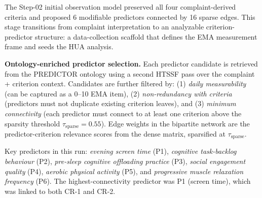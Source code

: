 \documentclass[11pt,a4paper]{article}
\newcommand{\PredictorCount}{6}
\newcommand{\SparseEdgeCount}{16}
\begin{document}
The Step-02 initial observation model preserved all four complaint-derived criteria and proposed \PredictorCount{} modifiable predictors connected by \SparseEdgeCount{} sparse edges. This stage transitions from complaint interpretation to an analyzable criterion-predictor structure: a data-collection scaffold that defines the EMA measurement frame and seeds the HUA analysis.

\begin{tcolorbox}[colback=PhoenixSoft,colframe=PhoenixGreen!40,boxrule=0.5pt,arc=1.5mm,left=7pt,right=7pt,top=6pt,bottom=6pt]
\small\textbf{Ontology-enriched predictor selection.} Each predictor candidate is retrieved from the PREDICTOR ontology using a second HTSSF pass over the complaint + criterion context. Candidates are further filtered by: (1) \emph{daily measurability} (can be captured as a 0--10 EMA item), (2) \emph{non-redundancy with criteria} (predictors must not duplicate existing criterion leaves), and (3) \emph{minimum connectivity} (each predictor must connect to at least one criterion above the sparsity threshold $\tau_{\text{sparse}} = 0.55$). Edge weights in the bipartite network are the predictor-criterion relevance scores from the dense matrix, sparsified at $\tau_{\text{sparse}}$.
\end{tcolorbox}

Key predictors in this run: \textit{evening screen time} (P1), \textit{cognitive task-backlog behaviour} (P2), \textit{pre-sleep cognitive offloading practice} (P3), \textit{social engagement quality} (P4), \textit{aerobic physical activity} (P5), and \textit{progressive muscle relaxation frequency} (P6). The highest-connectivity predictor was P1 (screen time), which was linked to both CR-1 and CR-2.
\end{document}
